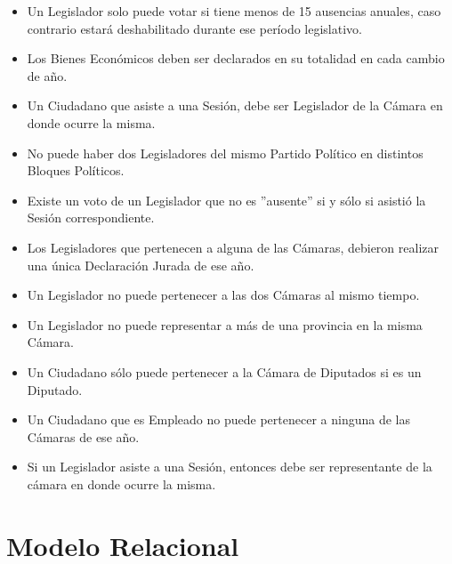 \begin{itemize}
	\item Un Legislador solo puede votar si tiene menos de 15 ausencias anuales, caso contrario estará deshabilitado durante ese período legislativo.
	\item Los Bienes Económicos deben ser declarados en su totalidad en cada cambio de año.
	\item Un Ciudadano que asiste a una Sesión, debe ser Legislador de la Cámara en donde ocurre la misma.
	\item No puede haber dos Legisladores del mismo Partido Político en distintos Bloques Políticos. 
	\item Existe un voto de un Legislador que no es ''ausente'' si y sólo si asistió la Sesión correspondiente.
	\item Los Legisladores que pertenecen a alguna de las Cámaras, debieron realizar una única Declaración Jurada de ese año.
	\item Un Legislador no puede pertenecer a las dos Cámaras al mismo tiempo. 
	\item Un Legislador no puede representar a más de una provincia en la misma Cámara. 
	\item Un Ciudadano sólo puede pertenecer a la Cámara de Diputados si es un Diputado.
	\item Un Ciudadano que es Empleado no puede pertenecer a ninguna de las Cámaras de ese año.	
	\item Si un Legislador asiste a una Sesión, entonces debe ser representante de la cámara en donde ocurre la misma.

\end{itemize}

\newpage

\section{Modelo Relacional}

